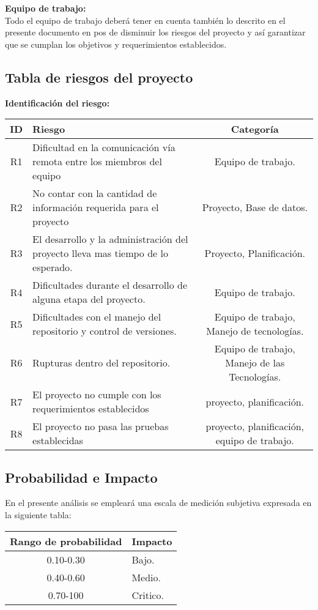 \documentclass[12pt,a4paper]{article}
\begin{document}
\textbf {Equipo de trabajo:} \vspace{5 mm} \\
Todo el equipo de trabajo deberá tener en cuenta también lo descrito en el presente documento en pos de
disminuir los riesgos del proyecto y así garantizar que se cumplan los objetivos y requerimientos establecidos.
\newpage

\subsection{Tabla de riesgos del proyecto}
\vspace{1 cm}
\textbf{Identificación del riesgo:}
\begin{table}[h!]
\centering
\begin{tabular}{|c|p{8cm}|c|}
\hline
\textbf{ID}&\textbf{Riesgo}&\textbf{Categoría}
\\\hline
R1&Dificultad en la comunicación vía remota entre los miembros del equipo&Equipo de trabajo.\\\hline
R2&No contar con la cantidad de información requerida para el proyecto&Proyecto, Base de datos.\\\hline
R3&El desarrollo y la administración del proyecto lleva mas tiempo de lo esperado.&Proyecto, Planificación.\\\hline
R4&Dificultades durante el desarrollo de alguna etapa del proyecto.&Equipo de trabajo.\\\hline
R5&Dificultades con el manejo del repositorio y control de versiones.&Equipo de trabajo, Manejo de tecnologías.\\\hline
R6&Rupturas dentro del repositorio.&Equipo de trabajo, Manejo de las Tecnologías.\\\hline
R7&El proyecto no cumple con los requerimientos establecidos&proyecto, planificación.\\\hline
R8&El proyecto no pasa las pruebas establecidas&proyecto, planificación, equipo de trabajo.\\\hline
\end{tabular}
\end{table}

\subsection{Probabilidad e Impacto}
En el presente análisis se empleará una escala de medición subjetiva expresada
en la siguiente tabla: 
\begin{table}[h!]
\begin{tabular}{|c|p{8cm}|}
\hline
\textbf{Rango de probabilidad}&\textbf{Impacto}
\\\hline
0.10-0.30&Bajo.\\\hline
0.40-0.60&Medio.\\\hline
0.70-100&Critico.\\\hline
\end{tabular}
\end{table}
\end{document}
